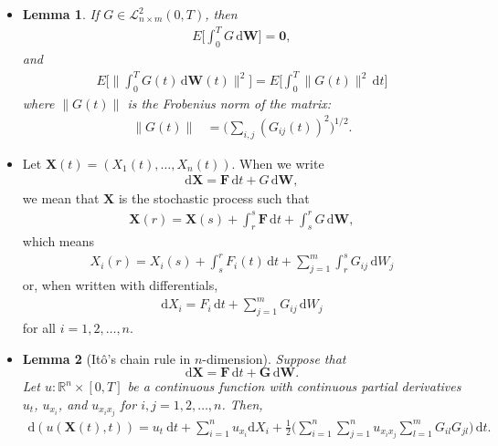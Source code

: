 \documentclass[10pt]{article}
\newtheorem{lemma}{Lemma}
\newcommand{\dee}{\mathrm{d}}
\newcommand{\ve}[1]{\mathbf{#1}}
\newcommand{\mcal}[1]{\mathcal{#1}}
\newcommand{\Real}{\mathbb{R}}
\begin{document}
\begin{itemize}
  \item \begin{lemma}
    If $G \in \mcal{L}_{n\times m}^2(0,T)$, then
    \begin{align*}
      E\bigg[ \int_0^T G\, \dee\ve{W} \bigg] = \ve{0},
    \end{align*}
    and
    \begin{align*}
      E\bigg[ \bigg\| \int_0^T G(t)\, \dee\ve{W}(t) \bigg\|^2 \bigg]
      = E\bigg[ \int_0^T \| G(t) \|^2\, \dee t \bigg]
    \end{align*}
    where $\| G(t) \|$ is the Frobenius norm of the matrix:
    \begin{align*}
      \| G(t) \| &= \bigg( \sum_{i,j} (G_{ij}(t))^2 \bigg)^{1/2}.
    \end{align*}
  \end{lemma}

  \item Let $\ve{X}(t) = (X_1(t), \dotsc, X_n(t))$. When we write
  \begin{align*}
    \dee \ve{X} = \ve{F}\, \dee t + G\, \dee \ve{W},    
  \end{align*}
  we mean that $\ve{X}$ is the stochastic process such that
  \begin{align*}
    \ve{X}(r) = \ve{X}(s) + \int_r^s \ve{F}\, \dee t + \int_s^r G\, \dee \ve{W},
  \end{align*}
  which means
  \begin{align*}
    X_i(r) = X_i(s) + \int_s^r F_i(t)\, \dee t + \sum_{j=1}^m \int_{r}^s G_{ij}\, \dee W_j
  \end{align*}
  or, when written with differentials,
  \begin{align*}
    \dee X_i = F_i\, \dee t + \sum_{j=1}^m G_{ij}\, \dee W_j
  \end{align*}
  for all $i = 1, 2, \dotsc, n$.

  \item \begin{lemma}[It\^{o}'s chain rule in $n$-dimension]
    Suppose that $$\dee \ve{X} = \ve{F}\, \dee t + \ve{G}\, \dee\ve{W}.$$ Let $u : \Real^n \times [0,T]$ be a continuous function with continuous partial derivatives $u_t$, $u_{x_i}$, and $u_{x_i x_j}$ for $i,j = 1, 2, \dotsc, n$. Then,
    \begin{align*}
      \dee(u(\ve{X}(t), t)) = u_t\ \dee t + \sum_{i=1}^n u_{x_i}\dee X_i + \frac{1}{2} \bigg( \sum_{i=1}^n \sum_{j=1}^n u_{x_i x_j} \sum_{l=1}^m G_{il}G_{jl} \bigg)\, \dee t.
    \end{align*}
  \end{lemma}


\end{itemize}
\end{document}
